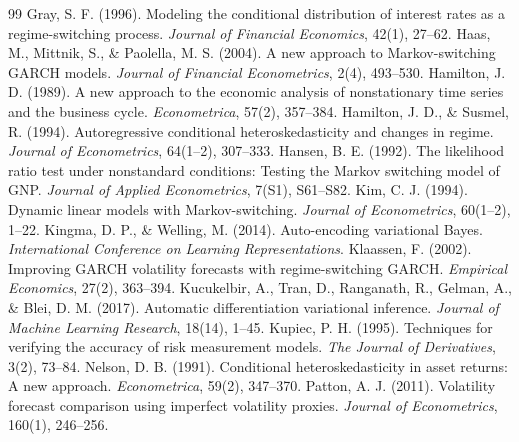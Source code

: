 \documentclass[12pt,a4paper]{article}
\numberwithin{equation}{section}
\theoremstyle{definition}
\begin{document}
\begin{thebibliography}{99}
 Gray, S. F. (1996). Modeling the conditional distribution of interest rates as a regime-switching process. \emph{Journal of Financial Economics}, 42(1), 27--62.
 Haas, M., Mittnik, S., \& Paolella, M. S. (2004). A new approach to Markov-switching GARCH models. \emph{Journal of Financial Econometrics}, 2(4), 493--530.
 Hamilton, J. D. (1989). A new approach to the economic analysis of nonstationary time series and the business cycle. \emph{Econometrica}, 57(2), 357--384.
 Hamilton, J. D., \& Susmel, R. (1994). Autoregressive conditional heteroskedasticity and changes in regime. \emph{Journal of Econometrics}, 64(1--2), 307--333.
 Hansen, B. E. (1992). The likelihood ratio test under nonstandard conditions: Testing the Markov switching model of GNP. \emph{Journal of Applied Econometrics}, 7(S1), S61--S82.
 Kim, C. J. (1994). Dynamic linear models with Markov-switching. \emph{Journal of Econometrics}, 60(1--2), 1--22.
 Kingma, D. P., \& Welling, M. (2014). Auto-encoding variational Bayes. \emph{International Conference on Learning Representations}.
 Klaassen, F. (2002). Improving GARCH volatility forecasts with regime-switching GARCH. \emph{Empirical Economics}, 27(2), 363--394.
 Kucukelbir, A., Tran, D., Ranganath, R., Gelman, A., \& Blei, D. M. (2017). Automatic differentiation variational inference. \emph{Journal of Machine Learning Research}, 18(14), 1--45.
 Kupiec, P. H. (1995). Techniques for verifying the accuracy of risk measurement models. \emph{The Journal of Derivatives}, 3(2), 73--84.
 Nelson, D. B. (1991). Conditional heteroskedasticity in asset returns: A new approach. \emph{Econometrica}, 59(2), 347--370.
 Patton, A. J. (2011). Volatility forecast comparison using imperfect volatility proxies. \emph{Journal of Econometrics}, 160(1), 246--256.
\end{thebibliography}
\end{document}
